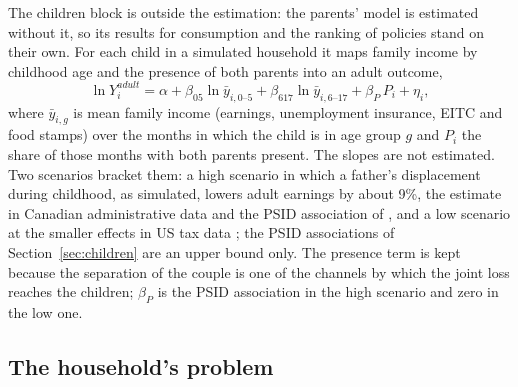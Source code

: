 The children block is outside the estimation: the parents' model is estimated without it, so its results for
consumption and the ranking of policies stand on their own. For each child in a simulated household it maps family
income by childhood age and the presence of both parents into an adult outcome,
\begin{equation}\label{eq:child}
  \ln Y^{adult}_i = \alpha + \beta_{05} \ln \bar y_{i,0\text{--}5} + \beta_{617} \ln \bar y_{i,6\text{--}17} + \beta_P\, P_i + \eta_i,
\end{equation}
where $\bar y_{i,g}$ is mean family income (earnings, unemployment insurance, EITC and food stamps) over the months in
which the child is in age group $g$ and $P_i$ the share of those months with both parents present. The slopes are
not estimated. Two scenarios bracket them: a high scenario in which a father's displacement during childhood, as
simulated, lowers adult earnings by about 9\%, the estimate in Canadian administrative data
\citep{oreopoulos2008intergenerational} and the PSID association of \citet{page2009parental}, and a low scenario at the
smaller effects in US tax data \citep{hilger2016parental}; the PSID associations of Section~\ref{sec:children} are an
upper bound only. The presence term is kept because the separation of the couple is one of the channels by which the
joint loss reaches the children; $\beta_P$ is the PSID association in the high scenario and zero in the low one.

\subsection{The household's problem}

